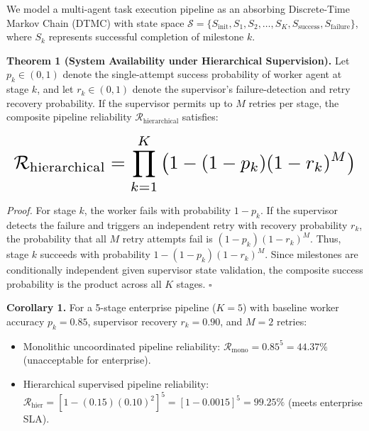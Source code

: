 \documentclass[10pt,journal,compsoc,twocolumn]{IEEEtran}
\begin{document}
We model a multi-agent task execution pipeline as an absorbing Discrete-Time Markov Chain (DTMC) with state space $\mathcal{S} = \{S_{\text{init}}, S_1, S_2, \ldots, S_K, S_{\text{success}}, S_{\text{failure}}\}$, where $S_k$ represents successful completion of milestone $k$.

\textbf{Theorem 1 (System Availability under Hierarchical Supervision).} Let $p_k \in (0, 1)$ denote the single-attempt success probability of worker agent at stage $k$, and let $r_k \in (0, 1)$ denote the supervisor's failure-detection and retry recovery probability. If the supervisor permits up to $M$ retries per stage, the composite pipeline reliability $\mathcal{R}_{\text{hierarchical}}$ satisfies:



















\begin{equation}
\resizebox{\columnwidth}{!}{$\displaystyle
\begin{aligned}
\mathcal{R}_{\text{hierarchical}} = \prod_{k=1}^K \left( 1 - (1 - p_k)(1 - r_k)^M \right)
\end{aligned}
$}
\end{equation}



















\textit{Proof.} For stage $k$, the worker fails with probability $1 - p_k$. If the supervisor detects the failure and triggers an independent retry with recovery probability $r_k$, the probability that all $M$ retry attempts fail is $(1 - p_k)(1 - r_k)^M$. Thus, stage $k$ succeeds with probability $1 - (1 - p_k)(1 - r_k)^M$. Since milestones are conditionally independent given supervisor state validation, the composite success probability is the product across all $K$ stages. $\square$

\textbf{Corollary 1.} For a 5-stage enterprise pipeline ($K = 5$) with baseline worker accuracy $p_k = 0.85$, supervisor recovery $r_k = 0.90$, and $M = 2$ retries:
\begin{itemize}
  \item Monolithic uncoordinated pipeline reliability: $\mathcal{R}_{\text{mono}} = 0.85^5 = 44.37\%$ (unacceptable for enterprise).
  \item Hierarchical supervised pipeline reliability: $\mathcal{R}_{\text{hier}} = [1 - (0.15)(0.10)^2]^5 = [1 - 0.0015]^5 = 99.25\%$ (meets enterprise SLA).
\end{itemize}
\end{document}
